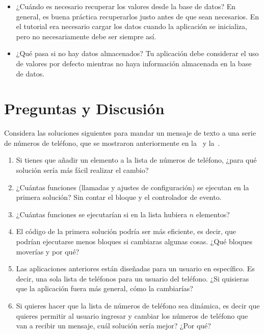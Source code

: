 {{\begin{itemize}

\item ¿Cuándo es necesario recuperar los valores desde la base de
  datos? En general, es buena práctica recuperarlos justo antes de que
  sean necesarios. En el tutorial era necesario cargar los datos
  cuando la aplicación se inicializa, pero no necesariamente debe ser
  siempre así.

\item ¿Qué pasa si no hay datos almacenados? Tu aplicación debe
  considerar el uso de valores por defecto mientras no haya
  información almacenada en la base de datos.

\end{itemize}

\section*{Preguntas y Discusión}

Considera las soluciones siguientes para mandar un mensaje de texto a
una serie de números de teléfono, que se mostraron anteriormente en
la~ y la~.

\begin{enumerate}

\item Si tienes que añadir un elemento a la lista de números de
  teléfono, ¿para qué solución sería más fácil realizar el cambio?

\item ¿Cuántas funciones (llamadas y ajustes de configuración) se
  ejecutan en la primera solución? Sin contar el bloque  y el controlador de evento.

\item ¿Cuántas funciones se ejecutarían si en la lista hubiera $n$ elementos?

\item El código de la primera solución podría ser más eficiente, es
  decir, que podrían ejecutarse menos bloques si cambiaras algunas
  cosas. ¿Qué bloques moverías y por qué?

\item Las aplicaciones anteriores están diseñadas para un usuario en
  específico. Es decir, una sola lista de teléfonos para un usuario
  del teléfono. ¿Si quisieras que la aplicación fuera más general,
  cómo la cambiarías?

\item Si quieres hacer que la lista de números de teléfono sea
  dinámica, es decir que quieres permitir al usuario ingresar y
  cambiar los números de teléfono que van a recibir un mensaje, cuál
  solución sería mejor? ¿Por qué?


\end{enumerate}}}
